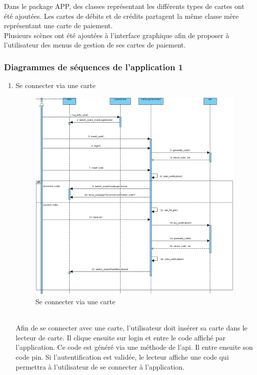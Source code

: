 \documentclass[../rapport.tex]{subfiles}
\begin{document}
Dans le package APP, des classes représentant les différents types de cartes ont été ajoutées. Les cartes de débits et de crédits partagent la même classe mère représentant une carte de paiement.\\

Plusieurs scènes ont été ajoutées à l'interface graphique afin de proposer à l'utilisateur des menus de gestion de ses cartes de paiement.\\

\subsubsection{Diagrammes de séquences de l'application 1}
\begin{enumerate}
	\item{Se connecter via une carte}\\
	\begin{figure}[h!]
		\centering\includegraphics[scale=0.15]{ressources/photos_diagrammes/extensionTheo/diagrams1/seConnecterViaCarte.jpg}
		\caption{Se connecter via une carte}
	\end{figure}\\

Afin de se connecter avec une carte, l'utilisateur doit insérer sa carte dans le lecteur de carte.
Il clique ensuite sur login  et entre le code affiché par l'application. Ce code est  généré via une méthode de l'api.
Il entre ensuite son code pin. Si l'autentification est validée, le lecteur affiche une code qui permettra à l'utilisateur de se connecter à l'application.\\
\end{enumerate}
\end{document}
